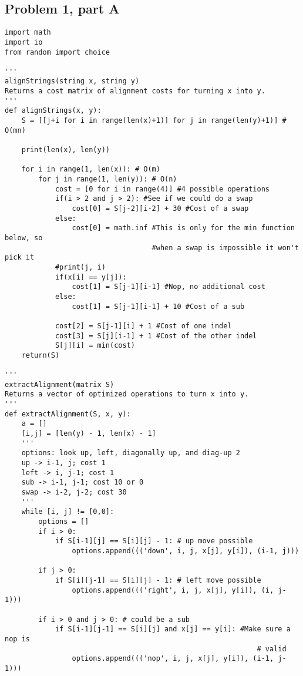 \documentclass[12pt]{article}
\begin{document}
\subsection{Problem 1, part A}
\begin{Verbatim}[fontsize=\small]
import math
import io
from random import choice

'''
alignStrings(string x, string y)
Returns a cost matrix of alignment costs for turning x into y.
'''
def alignStrings(x, y):
    S = [[j+i for i in range(len(x)+1)] for j in range(len(y)+1)] # O(mn)

    print(len(x), len(y))

    for i in range(1, len(x)): # O(m)
        for j in range(1, len(y)): # O(n)
            cost = [0 for i in range(4)] #4 possible operations
            if(i > 2 and j > 2): #See if we could do a swap
                cost[0] = S[j-2][i-2] + 30 #Cost of a swap
            else:
                cost[0] = math.inf #This is only for the min function below, so
                                   #when a swap is impossible it won't pick it
            #print(j, i)
            if(x[i] == y[j]):
                cost[1] = S[j-1][i-1] #Nop, no additional cost
            else:
                cost[1] = S[j-1][i-1] + 10 #Cost of a sub

            cost[2] = S[j-1][i] + 1 #Cost of one indel
            cost[3] = S[j][i-1] + 1 #Cost of the other indel
            S[j][i] = min(cost)
    return(S)

'''
extractAlignment(matrix S)
Returns a vector of optimized operations to turn x into y.
'''
def extractAlignment(S, x, y):
    a = []
    [i,j] = [len(y) - 1, len(x) - 1]
    '''
    options: look up, left, diagonally up, and diag-up 2
    up -> i-1, j; cost 1
    left -> i, j-1; cost 1
    sub -> i-1, j-1; cost 10 or 0
    swap -> i-2, j-2; cost 30
    '''
    while [i, j] != [0,0]:
        options = []
        if i > 0:
            if S[i-1][j] == S[i][j] - 1: # up move possible
                options.append((('down', i, j, x[j], y[i]), (i-1, j)))

        if j > 0:
            if S[i][j-1] == S[i][j] - 1: # left move possible
                options.append((('right', i, j, x[j], y[i]), (i, j-1)))

        if i > 0 and j > 0: # could be a sub
            if S[i-1][j-1] == S[i][j] and x[j] == y[i]: #Make sure a nop is
                                                            # valid
                options.append((('nop', i, j, x[j], y[i]), (i-1, j-1)))


\end{Verbatim}
\end{document}
